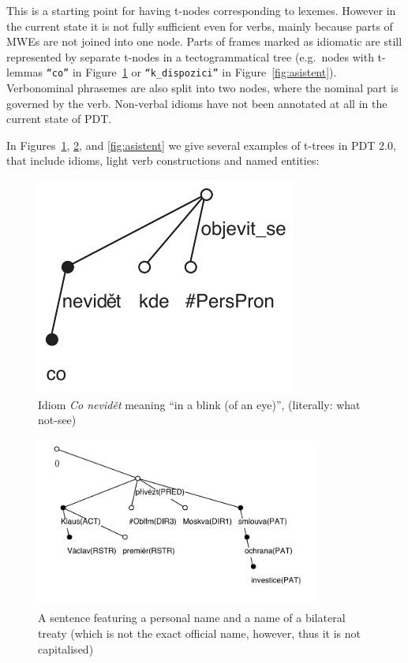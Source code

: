 This is a starting point for having t-nodes corresponding to lexemes. However in the current state it is not fully sufficient even for verbs, mainly because parts of MWEs are not joined into one node. Parts of frames marked as idiomatic are still represented by separate t-nodes in a tectogrammatical tree (e.g.~nodes with t-lemmas {\tt“co”} in Figure~\ref{fig:co-nevidet} or {\tt“k\_dispozici”} in Figure~\ref{fig:asistent}). Verbonominal phrasemes are also split into two nodes, where the nominal part is governed by the verb. Non-verbal idioms have not been annotated at all in the current state of PDT. 

In Figures~\ref{fig:co-nevidet}, \ref{fig:klaus}, and \ref{fig:asistent} we give several examples of t-trees in PDT 2.0, that include idioms, light verb constructions and named entities:
\begin{figure}[htbp]
   \centerline{\includegraphics[scale=.7]{images/co-nevidet-clause.pdf}}
   \caption{\label{fig:co-nevidet}Idiom \emph{Co nevidět} meaning ``in a blink (of an eye)'', (literally: what not-see)}
\end{figure}

\begin{figure}[htbp]
   \centerline{\includegraphics[width=3.7in]{images/klaus-a-smlouva.pdf}}
   \caption{A sentence featuring a personal name and a name of a bilateral treaty (which is not the exact official name, however, thus it is not capitalised)}
   \label{fig:klaus}
\end{figure}

